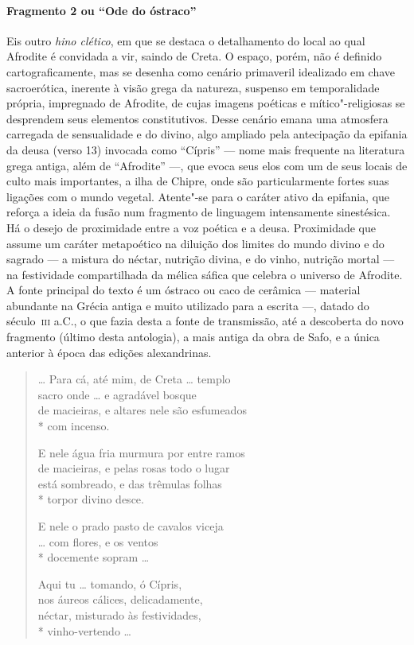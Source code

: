 \paragraph{Fragmento 2 ou “Ode do óstraco”}

{\small Eis outro \textit{hino clético}, em que se destaca o detalhamento do local ao
qual Afrodite é convidada a vir, saindo de Creta. O espaço, porém, não é
definido cartograficamente, mas se desenha como cenário primaveril idealizado
em chave sacroerótica, inerente à visão grega da natureza, suspenso em
temporalidade própria, impregnado de Afrodite, de cujas imagens poéticas e
mítico"-religiosas se desprendem seus elementos constitutivos. Desse cenário
emana uma atmosfera carregada de sensualidade e do divino, algo ampliado pela
antecipação da epifania da deusa (verso 13) invocada como ``Cípris'' ---
nome mais frequente na literatura grega antiga, além de “Afrodite” ---, que evoca
seus elos com um de seus locais de culto mais importantes, a ilha de Chipre,
onde são particularmente fortes suas ligações com o mundo vegetal. Atente"-se
para o caráter ativo da epifania, que reforça a ideia da fusão num fragmento de
linguagem intensamente sinestésica. Há o desejo de proximidade
entre a voz poética e a deusa. Proximidade que assume um caráter metapoético na diluição dos limites do mundo divino e do sagrado --- a mistura do néctar, nutrição divina, e do vinho, nutrição mortal --- na festividade compartilhada da mélica sáfica que celebra o universo de Afrodite. A fonte principal do texto é um óstraco ou caco
de cerâmica --- material abundante na Grécia antiga e muito utilizado para a
escrita ---, datado do século~\textsc{iii} a.C., o que fazia desta a fonte de transmissão, 
até a descoberta do novo fragmento (último desta antologia), a mais antiga da obra de Safo, e a
única anterior à época das edições alexandrinas.}

\begin{verse}
\ldots{} Para cá, até mim, de Creta \ldots{} templo\\
sacro onde \ldots{} e agradável bosque\\
de macieiras, e altares nele são esfumeados\\*
com incenso.

E nele água fria murmura por entre ramos\\
de macieiras, e pelas rosas todo o lugar\\
está sombreado, e das trêmulas folhas\\*
torpor divino desce.

E nele o prado pasto de cavalos viceja\\
\ldots{} com flores, e os ventos\\*
docemente sopram \ldots{}

Aqui tu \ldots{} tomando, ó Cípris,\\
nos áureos cálices, delicadamente,\\
néctar, misturado às festividades,\\*
vinho-vertendo \ldots{}
\end{verse}

